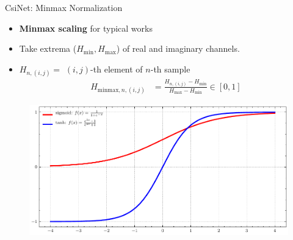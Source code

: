 \documentclass{beamer}
\begin{document}
  \begin{frame}{CsiNet: Minmax Normalization}
    \footnotesize{
    \begin{itemize}
      \item \textbf{Minmax scaling} for typical works
      \item Take extrema ($H_{\text{min}}, H_{\text{max}}$) of real and imaginary channels.
      \item $H_{n,(i,j)}=$ $(i,j)$-th element of $n$-th sample
      \begin{align*}
        H_{\text{minmax},n,(i,j)} &= \frac{H_{n,(i,j)}- H_{\text{min}}}{H_{\text{max}}- H_{\text{min}}} \in [0,1] 
      \end{align*}
    \end{itemize}
    }
    \begin{figure}[htb]
      \centering
      \includegraphics[width=.7\textwidth]{activations.pdf}
    \end{figure}
  \end{frame}
\end{document}
